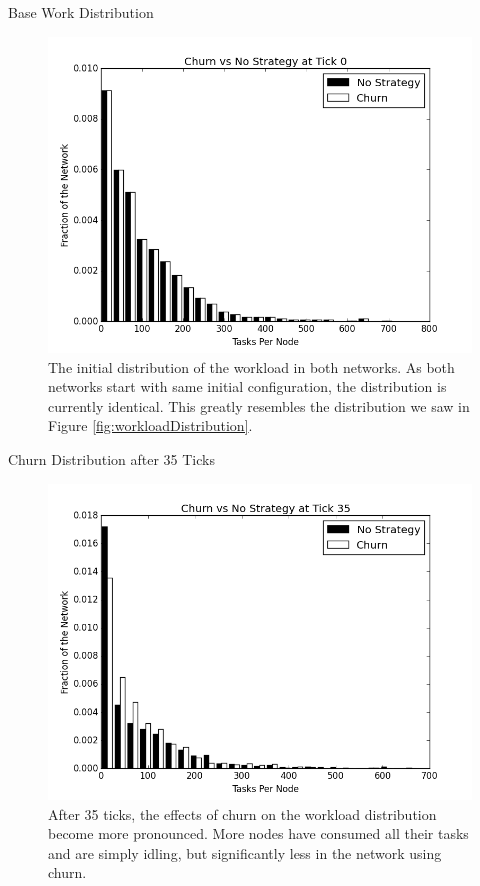 \documentclass[11pt]{beamer}
\begin{document}
\begin{frame}{Base Work Distribution}
\begin{figure}
	\centering
	\includegraphics[width=0.7\linewidth]{figs/ChurnStableHist0}
	\caption[Workload for churn at tick 0]{The initial distribution of the workload in both networks.  As both networks start with same initial configuration, the distribution is currently identical.  This greatly resembles the distribution we saw in Figure \ref{fig:workloadDistribution}.}
	
	\label{fig:churnStableHist0}
\end{figure}
\end{frame}




\begin{frame}{Churn Distribution after 35 Ticks}
\begin{figure}
	\centering
	\includegraphics[width=0.7\linewidth]{figs/ChurnStableHist35}
	\caption[Workload for churn at tick 35]{After 35 ticks, the effects of churn on the workload distribution become more pronounced.  More nodes have consumed all their tasks and are simply idling, but significantly less in the network using churn.}
	\label{fig:churnStableHist35}
\end{figure}
\end{frame}
\end{document}
